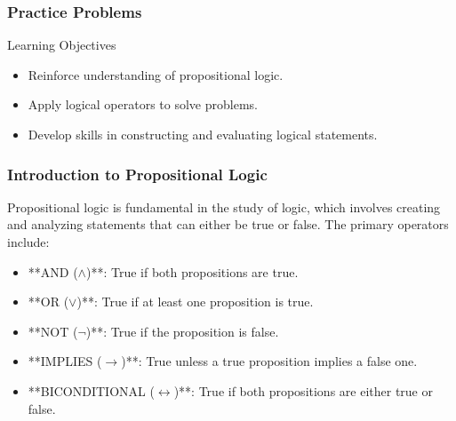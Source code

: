 \documentclass[aspectratio=169]{beamer}
\begin{document}
\begin{frame}[fragile]
    \frametitle{Practice Problems}
    \begin{block}{Learning Objectives}
        \begin{itemize}
            \item Reinforce understanding of propositional logic.
            \item Apply logical operators to solve problems.
            \item Develop skills in constructing and evaluating logical statements.
        \end{itemize}
    \end{block}
\end{frame}

\begin{frame}[fragile]
    \frametitle{Introduction to Propositional Logic}
    Propositional logic is fundamental in the study of logic, which involves creating and analyzing statements that can either be true or false. The primary operators include:
    
    \begin{itemize}
        \item **AND ($\land$)**: True if both propositions are true.
        \item **OR ($\lor$)**: True if at least one proposition is true.
        \item **NOT ($\neg$)**: True if the proposition is false.
        \item **IMPLIES ($\rightarrow$)**: True unless a true proposition implies a false one.
        \item **BICONDITIONAL ($\leftrightarrow$)**: True if both propositions are either true or false.
    \end{itemize}
\end{frame}
\end{document}
